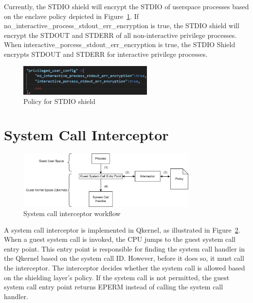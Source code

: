 Currently, the STDIO shield will encrypt the STDIO of userspace processes based on the enclave policy depicted in Figure~\ref{fig:stdio_policy}. If no\_interactive\_process\_stdout\_err\_encryption is true, the STDIO shield will encrypt the STDOUT and STDERR of all 
non-interactive privilege processes. When interactive\_porcess\_stdout\_err\_encryption is true, the STDIO Shield encrypts STDOUT and STDERR for interactive privilege processes.

\begin{figure}[!htb]
    \centering
    \includegraphics[width=0.6\textwidth]{images/stdio_policy.png}
    \caption[Policy for STDIO shield]{Policy for STDIO shield}
    \label{fig:stdio_policy}
\end{figure}


\section{System Call Interceptor}
\label{sec:design_Interceptor}
\begin{figure}[!htb]
    \centering
    \includegraphics[width=0.8\textwidth]{images/syscall_interceptor.png}
    \caption[System call interceptor workflow]{System call interceptor workflow}
    \label{fig:syscall_interceptor}
\end{figure}
A system call interceptor is implemented in Qkernel, as illustrated in Figure~\ref{fig:syscall_interceptor}. When a guest system call is invoked, the CPU jumps to the guest system call entry point. This entry point is responsible for finding the system call handler in the Qkernel based on the system 
call ID. However, before it does so, it must call the interceptor. The interceptor decides whether the system call is allowed based on the shielding layer's policy. If the system call is not permitted, the guest system call entry point returns EPERM instead of calling the 
system call handler.

